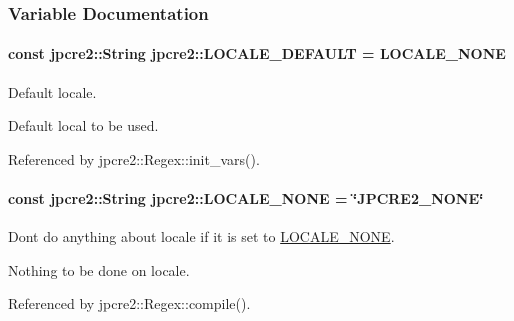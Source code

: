 \subsubsection{Variable Documentation}
\paragraph[{\texorpdfstring{L\+O\+C\+A\+L\+E\+\_\+\+D\+E\+F\+A\+U\+LT}{LOCALE_DEFAULT}}]{\setlength{\rightskip}{0pt plus 5cm}const {\bf jpcre2\+::\+String} jpcre2\+::\+L\+O\+C\+A\+L\+E\+\_\+\+D\+E\+F\+A\+U\+LT = {\bf L\+O\+C\+A\+L\+E\+\_\+\+N\+O\+NE}}\hypertarget{namespacejpcre2_adfdd3d1fff99e685734ae4e59771e84d}{}\label{namespacejpcre2_adfdd3d1fff99e685734ae4e59771e84d}


Default locale. 

Default local to be used. 

Referenced by jpcre2\+::\+Regex\+::init\+\_\+vars().

\paragraph[{\texorpdfstring{L\+O\+C\+A\+L\+E\+\_\+\+N\+O\+NE}{LOCALE_NONE}}]{\setlength{\rightskip}{0pt plus 5cm}const {\bf jpcre2\+::\+String} jpcre2\+::\+L\+O\+C\+A\+L\+E\+\_\+\+N\+O\+NE = \char`\"{}J\+P\+C\+R\+E2\+\_\+\+N\+O\+NE\char`\"{}}\hypertarget{namespacejpcre2_ad2236dcdcc14d580724b256ce7f168e5}{}\label{namespacejpcre2_ad2236dcdcc14d580724b256ce7f168e5}


Don\textquotesingle{}t do anything about locale if it is set to \hyperlink{namespacejpcre2_ad2236dcdcc14d580724b256ce7f168e5}{L\+O\+C\+A\+L\+E\+\_\+\+N\+O\+NE}. 

Nothing to be done on locale. 

Referenced by jpcre2\+::\+Regex\+::compile().


